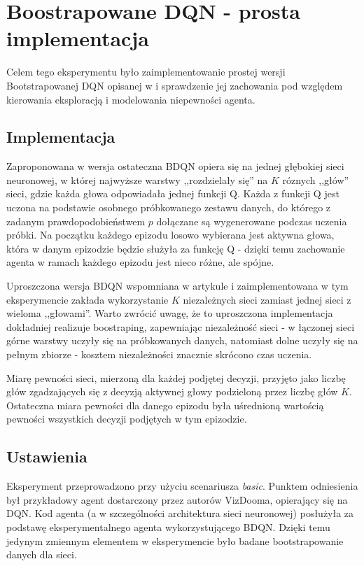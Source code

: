 \section{Boostrapowane DQN - prosta implementacja}
Celem tego eksperymentu było zaimplementowanie prostej wersji Bootstrapowanej DQN opisanej w \cite{DBLP:journals/corr/OsbandBPR16} i sprawdzenie jej zachowania pod względem kierowania eksploracją i modelowania niepewności agenta.

\subsection{Implementacja}
Zaproponowana w \cite{DBLP:journals/corr/OsbandBPR16} wersja ostateczna BDQN opiera się na jednej głębokiej sieci neuronowej, w której najwyższe warstwy ,,rozdzielały się'' na $K$ róznych ,,głów'' sieci, gdzie każda głowa odpowiadała jednej funkcji Q. Każda z funkcji Q jest uczona na podstawie osobnego próbkowanego zestawu danych, do którego z zadanym prawdopodobieństwem $p$ dołączane są wygenerowane podczas uczenia próbki. Na początku każdego epizodu losowo wybierana jest aktywna głowa, która w danym epizodzie będzie służyła za funkcję Q - dzięki temu zachowanie agenta w ramach każdego epizodu jest nieco różne, ale spójne.

Uproszczona wersja BDQN wspomniana w artykule i zaimplementowana w tym eksperymencie zakłada wykorzystanie $K$ niezależnych sieci zamiast jednej sieci z wieloma ,,głowami''. Warto zwrócić uwagę, że to uproszczona implementacja dokładniej realizuje boostraping, zapewniając niezależność sieci - w łączonej sieci górne warstwy uczyły się na próbkowanych danych, natomiast dolne uczyły się na pełnym zbiorze - kosztem niezależności znacznie skrócono czas uczenia.

Miarę pewności sieci, mierzoną dla każdej podjętej decyzji, przyjęto jako liczbę głów zgadzających się z decyzją aktywnej głowy podzieloną przez liczbę głów $K$. Ostateczna miara pewności dla danego epizodu była uśrednioną wartością pewności wszystkich decyzji podjętych w tym epizodzie.

\subsection{Ustawienia}
Eksperyment przeprowadzono przy użyciu scenariusza \textit{basic}. Punktem odniesienia był przykładowy agent dostarczony przez autorów VizDooma, opierający się na DQN. Kod agenta (a w szczególności architektura sieci neuronowej) posłużyła za podstawę eksperymentalnego agenta wykorzystującego BDQN. Dzięki temu jedynym zmiennym elementem w eksperymencie było badane bootstrapowanie danych dla sieci.


